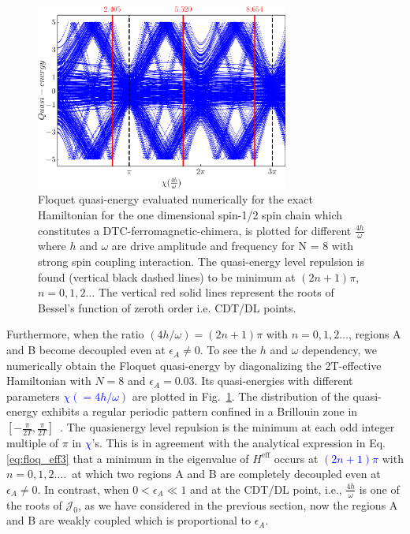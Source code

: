 \documentclass[%
reprint,
superscriptaddress,
amsmath,amssymb,showkeys,
aps,
prb,
]{revtex4-2}
\newcommand{\blue}[1]{\textcolor{blue}{#1}}
\begin{document}
	\begin{figure}
		\centering
		\includegraphics[width=8.3cm]{quasienergy_8.pdf}	
		\caption{Floquet quasi-energy evaluated numerically for the exact Hamiltonian for the one dimensional spin-1/2 spin chain which constitutes a DTC-ferromagnetic-chimera, is plotted for different $\frac{4h}{\omega}$ where $h$ and $\omega$ are drive amplitude and frequency for N = 8 with strong spin coupling interaction. The quasi-energy level repulsion is found (vertical black dashed lines) to be minimum at $(2n+1)\pi$, $n=0,1,2\dots$ The vertical red solid lines represent the roots of Bessel's function of zeroth order i.e. CDT/DL points.}
		\label{Fig:quasienergy}
	\end{figure}
	
	Furthermore, when the ratio $({4h}/{\omega}) = (2n+1)\pi$ with $n = 0,1,2\dots$, regions A and B become decoupled even at $\epsilon_A \neq 0$. To see the $h$ and $\omega$ dependency, we numerically obtain the Floquet quasi-energy by diagonalizing the 2T-effective Hamiltonian with $N=8$ and $\epsilon_A=0.03$. Its quasi-energies with different parameters \blue{$\chi( = {4h}/{\omega})$} are plotted in Fig.~\ref{Fig:quasienergy}. The distribution of the quasi-energy exhibits a regular periodic pattern confined in a Brillouin zone in $[-\frac{\pi}{2T}, \frac{\pi}{2T}]$~\cite{dutta2014}. The quasienergy level repulsion is the minimum at each odd integer multiple of $\pi$ in  \blue{$\chi$}'s. This is in agreement with the analytical expression in Eq.\eqref{eq:floq_eff3} that a minimum in the eigenvalue of $H^{\mathrm{eff}}$ occurs at \blue{$(2n+1)\pi$} with $n=0,1,2\dots$.\, at which two regions A and B are completely decoupled even at $\epsilon_A \neq 0$. In contrast, when $0 < \epsilon_A \ll 1 $ and at the CDT/DL point, i.e., $\frac{4h}{\omega}$ is one of the roots of $\mathcal{J}_0$, as we have considered in the previous section, now the regions A and B are weakly coupled which is proportional to $\epsilon_A$. 	
	
\end{document}
